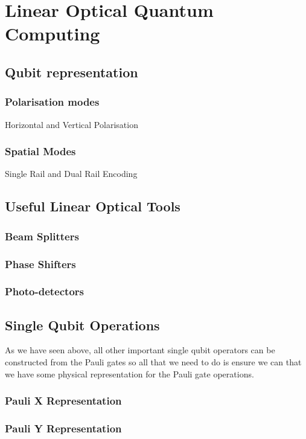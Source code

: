 \section{Linear Optical Quantum Computing}

\subsection{Qubit representation}
\subsubsection{Polarisation modes}
Horizontal and Vertical Polarisation
\subsubsection{Spatial Modes}
Single Rail and Dual Rail Encoding



\subsection{Useful Linear Optical Tools}
\subsubsection{Beam Splitters}
\subsubsection{Phase Shifters}
\subsubsection{Photo-detectors}


\subsection{Single Qubit Operations}
As we have seen above, all other important single qubit operators can be constructed from the Pauli gates so all that we need to do is ensure we can that we have some physical representation for the Pauli gate operations.
\subsubsection{Pauli X Representation}
\subsubsection{Pauli Y Representation}
